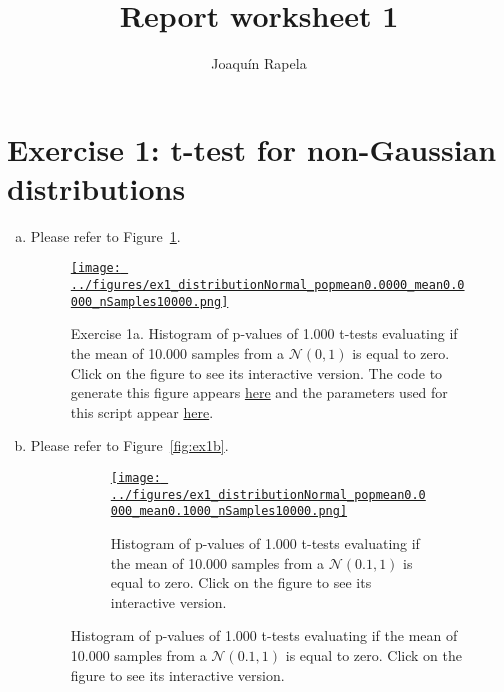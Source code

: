 \documentclass{article}
\title{Report worksheet 1}
\author{Joaqu\'{i}n Rapela}
\begin{document}
\maketitle

\section*{Exercise 1: t-test for non-Gaussian distributions}

\begin{enumerate}[(a)]

    \item  Please refer to Figure~\ref{fig:ex1a}.

        \begin{figure}
            \begin{center}
                \href{https://www.gatsby.ucl.ac.uk/~rapela/neuroinformatics/2023/ws1/figures/ex1_distributionNormal_popmean0.0000_mean0.0000_nSamples10000.html}{\texttt{[image: ../figures/ex1\_distributionNormal\_popmean0.0000\_mean0.0000\_nSamples10000.png]}}

                \caption{Exercise 1a. Histogram of p-values of 1.000 t-tests
                evaluating if the mean of 10.000 samples from a $\mathcal{N}(0,
                1)$ is equal to zero.
                Click on the figure to see its interactive version.
                The code to generate this figure appears
                \href{https://github.com/joacorapela/neuroinformatics23/blob/master/worksheets/ws1/mySolution/code/scripts/doEx1.py}{here} and the
                parameters used for this script appear
                \href{https://github.com/joacorapela/neuroinformatics23/blob/master/worksheets/ws1/mySolution/code/scripts/doEx1a.csh}{here}.}

                \label{fig:ex1a}

            \end{center}
        \end{figure}

    \item  Please refer to Figure~\ref{fig:ex1b}.

        \begin{figure}
            \begin{center}

                \begin{subfigure}{1.0\textwidth}
                    \centering
                    \href{https://www.gatsby.ucl.ac.uk/~rapela/neuroinformatics/2023/ws1/figures/ex1_distributionNormal_popmean0.0000_mean0.1000_nSamples10000.html}{\texttt{[image: ../figures/ex1\_distributionNormal\_popmean0.0000\_mean0.1000\_nSamples10000.png]}}
                    \caption{Histogram of p-values of 1.000 t-tests evaluating if the mean of 10.000 samples from a $\mathcal{N}(0.1, 1)$ is equal to zero.  Click on the figure to see its interactive version.}
                    \label{fig:ex1b_1}
                \end{subfigure}


\end{center}
\end{figure}
\end{enumerate}
\end{document}
